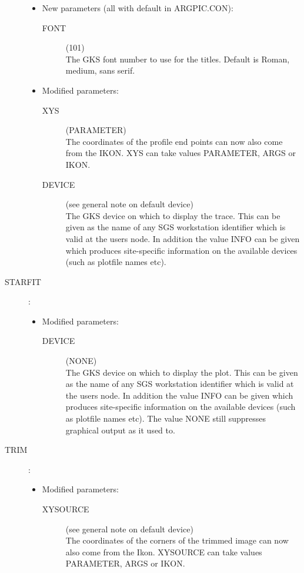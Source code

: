 \begin{description}
\begin{itemize}
\item New parameters (all with default in ARGPIC.CON):
\begin{description}
\item [FONT](101)\\
 The GKS font number to use for the titles.
 Default is Roman, medium, sans serif.
\end{description}
\item Modified parameters:
\begin{description}
\item [XYS](PARAMETER)\\
 The coordinates of the profile end points can now also come from the IKON.
 XYS can take values PARAMETER, ARGS or IKON.
\item [DEVICE](see general note on default device)\\
 The GKS device on which to display the trace.
 This can be given as the name of any SGS workstation identifier which is valid
 at the users node.
 In addition the value INFO can be given which produces site-specific
 information on the available devices (such as plotfile names etc).
\end{description}
\end{itemize}

\item [STARFIT]:

\begin{itemize}
\item Modified parameters:
\begin{description}
\item [DEVICE](NONE)\\
 The GKS device on which to display the plot.
 This can be given as the name of any SGS workstation identifier which is valid
 at the users node.
 In addition the value INFO can be given which produces site-specific
 information on the available devices (such as plotfile names etc).
 The value NONE still suppresses graphical output as it used to.
\end{description}
\end{itemize}

\item [TRIM]:

\begin{itemize}
\item Modified parameters:
\begin{description}
\item [XYSOURCE](see general note on default device)\\
 The coordinates of the corners of the trimmed image can now also come from the
 Ikon.
 XYSOURCE can take values PARAMETER, ARGS or IKON.
\end{description}
\end{itemize}


\end{description}
